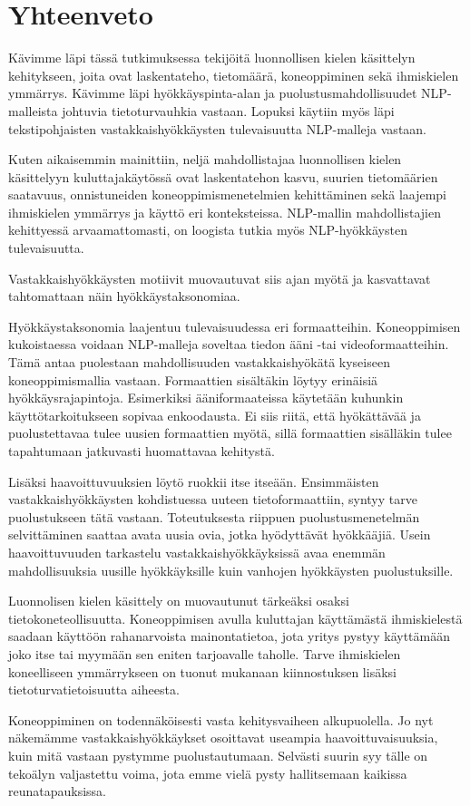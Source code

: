 \chapter{Yhteenveto\label{conclusions}}

Kävimme läpi tässä tutkimuksessa tekijöitä luonnollisen kielen käsittelyn kehitykseen, joita ovat laskentateho, tietomäärä, koneoppiminen sekä ihmiskielen ymmärrys. Kävimme läpi hyökkäyspinta-alan ja puolustusmahdollisuudet NLP-malleista johtuvia tietoturvauhkia vastaan. Lopuksi käytiin myös läpi tekstipohjaisten vastakkaishyökkäysten tulevaisuutta NLP-malleja vastaan.

Kuten aikaisemmin mainittiin, neljä mahdollistajaa luonnollisen kielen käsittelyyn kuluttajakäytössä ovat laskentatehon kasvu, suurien tietomäärien saatavuus, onnistuneiden koneoppimismenetelmien kehittäminen sekä laajempi ihmiskielen ymmärrys ja käyttö eri konteksteissa. NLP-mallin mahdollistajien kehittyessä arvaamattomasti, on loogista tutkia myös NLP-hyökkäysten tulevaisuutta. 

Vastakkaishyökkäysten motiivit muovautuvat siis ajan myötä ja kasvattavat tahtomattaan näin hyökkäystaksonomiaa. 

Hyökkäystaksonomia laajentuu tulevaisuudessa eri formaatteihin. Koneoppimisen kukoistaessa voidaan NLP-malleja soveltaa tiedon ääni -tai videoformaatteihin. Tämä antaa puolestaan mahdollisuuden vastakkaishyökätä kyseiseen koneoppimismallia vastaan. Formaattien sisältäkin löytyy erinäisiä hyökkäysrajapintoja. Esimerkiksi ääniformaateissa käytetään kuhunkin käyttötarkoitukseen sopivaa enkoodausta. Ei siis riitä, että hyökättävää ja puolustettavaa tulee uusien formaattien myötä, sillä formaattien sisälläkin tulee tapahtumaan jatkuvasti huomattavaa kehitystä.

Lisäksi haavoittuvuuksien löytö ruokkii itse itseään. Ensimmäisten vastakkaishyökkäysten kohdistuessa uuteen tietoformaattiin, syntyy tarve puolustukseen tätä vastaan. Toteutuksesta riippuen puolustusmenetelmän selvittäminen saattaa avata uusia ovia, jotka hyödyttävät hyökkääjiä. Usein haavoittuvuuden tarkastelu vastakkaishyökkäyksissä avaa enemmän mahdollisuuksia uusille hyökkäyksille kuin vanhojen hyökkäysten puolustuksille.

Luonnolisen kielen käsittely on muovautunut tärkeäksi osaksi tietokoneteollisuutta. Koneoppimisen avulla kuluttajan käyttämästä ihmiskielestä saadaan käyttöön rahanarvoista mainontatietoa, jota yritys pystyy käyttämään joko itse tai myymään sen eniten tarjoavalle taholle. Tarve ihmiskielen koneelliseen ymmärrykseen on tuonut mukanaan kiinnostuksen lisäksi tietoturvatietoisuutta aiheesta.


Koneoppiminen on todennäköisesti vasta kehitysvaiheen alkupuolella. Jo nyt näkemämme vastakkaishyökkäykset osoittavat useampia haavoittuvaisuuksia, kuin mitä vastaan pystymme puolustautumaan. Selvästi suurin syy tälle on tekoälyn valjastettu voima, jota emme vielä pysty hallitsemaan kaikissa reunatapauksissa.